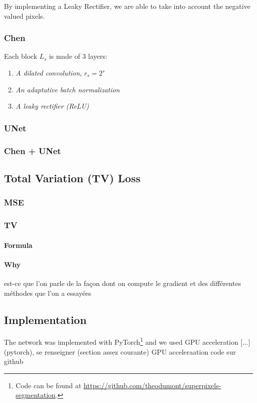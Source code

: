 \documentclass{article}
\begin{document}
            By implementing a Leaky Rectifier, we are able to take into account the negative valued pixels.



        \subsubsection{Chen}
        Each block $L_s$ is made of 3 layers:
        \begin{enumerate}
            \item \textit{A dilated convolution}, $r_s=2^s$
            \item \textit{An adaptative batch normalization}
            \item \textit{A leaky rectifier (ReLU)}
        \end{enumerate}



        \subsubsection{UNet}
        \subsubsection{Chen + UNet}

    \subsection{Total Variation (TV) Loss}
        \subsubsection{MSE}
        \subsubsection{TV}
            \paragraph{Formula}
            \paragraph{Why}

est-ce que l'on parle de la façon dont on compute le gradient et des différentes méthodes que l'on a essayées

    \subsection{Implementation}
    The network was implemented with PyTorch\footnote{Code can be found at \url{https://github.com/theodumont/superpixels-segmentation}.} and we used GPU acceleration [...]
    (pytorch), se renseigner (section assez courante)
    GPU acceleraation
    code sur github
\end{document}
